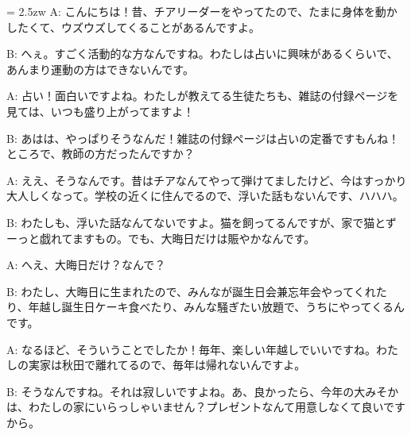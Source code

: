 \documentclass[11pt]{amsart}
\title{}
\author{}
\newenvironment{hangall}[1]{\hangindent = 2.5zw\everypar{\hangindent = 2.5zw}}{}
\begin{document}
\maketitle
\begin{hangall}{}%
A: こんにちは！昔、チアリーダーをやってたので、たまに身体を動かしたくて、ウズウズしてくることがあるんですよ。

B: へぇ。すごく活動的な方なんですね。わたしは占いに興味があるくらいで、あんまり運動の方はできないんです。

A: 占い！面白いですよね。わたしが教えてる生徒たちも、雑誌の付録ページを見ては、いつも盛り上がってますよ！

B: あはは、やっぱりそうなんだ！雑誌の付録ページは占いの定番ですもんね！ところで、教師の方だったんですか？

A: ええ、そうなんです。昔はチアなんてやって弾けてましたけど、今はすっかり大人しくなって。学校の近くに住んでるので、浮いた話もないんです、ハハハ。

B: わたしも、浮いた話なんてないですよ。猫を飼ってるんですが、家で猫とずーっと戯れてますもの。でも、大晦日だけは賑やかなんです。

A: へえ、大晦日だけ？なんで？

B: わたし、大晦日に生まれたので、みんなが誕生日会兼忘年会やってくれたり、年越し誕生日ケーキ食べたり、みんな騒ぎたい放題で、うちにやってくるんです。

A: なるほど、そういうことでしたか！毎年、楽しい年越しでいいですね。わたしの実家は秋田で離れてるので、毎年は帰れないんですよ。

B: そうなんですね。それは寂しいですよね。あ、良かったら、今年の大みそかは、わたしの家にいらっしゃいません？プレゼントなんて用意しなくて良いですから。
\end{hangall}
\end{document}
